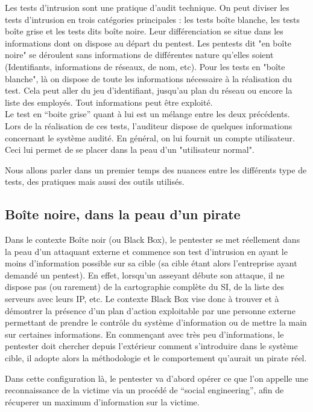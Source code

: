 \documentclass[a4paper]{memoir}
\begin{document}
Les tests d'intrusion sont une pratique d'audit technique. On peut diviser les tests d'intrusion en trois catégories principales : les tests boîte blanche, les tests boîte grise et les tests dits boîte noire. Leur différenciation se situe dans les informations dont on dispose au départ du pentest. Les pentests dit "en boîte noire" se déroulent sans informations de différentes nature qu'elles soient (Identifiants, informations de réseaux, de nom, etc). Pour les tests en "boîte blanche", là on dispose de toute les informations nécessaire à la réalisation du test. Cela peut aller du jeu d'identifiant, jusqu'au plan du réseau ou encore la liste des employés. Tout informations peut être exploité.\\
\noindent Le test en ``boite grise'' quant à lui est un mélange entre les deux précédents. Lors de la réalisation de ces tests, l'auditeur dispose de quelques informations concernant le système audité. En général, on lui fournit un compte utilisateur. Ceci lui permet de se placer dans la peau d'un "utilisateur normal". 

Nous allons parler dans un premier temps des nuances entre les différents type de tests, des pratiques mais aussi des outils utilisés.



\subsection{Boîte noire, dans la peau d'un pirate}

Dans le contexte Boîte noir (ou Black Box), le pentester se met réellement dans la peau d’un attaquant externe et commence son test d’intrusion en ayant le moins d’information possible sur sa cible (sa cible étant alors l’entreprise ayant demandé un pentest). En effet, lorsqu’un asseyant débute son attaque, il ne dispose pas (ou rarement) de la cartographie complète du SI, de la liste des serveurs avec leurs IP, etc. Le contexte Black Box vise donc à trouver et à démontrer la présence d’un plan d’action exploitable par une personne externe permettant de prendre le contrôle du système d’information ou de mettre la main sur certaines informations. En commençant avec très peu d’informations, le pentester doit chercher depuis l’extérieur comment s’introduire dans le système cible, il adopte alors la méthodologie et le comportement qu’aurait un pirate réel. 

Dans cette configuration là, le pentester va d'abord opérer ce que l'on appelle une reconnaissance de la victime via un procédé de ``social engineering'', afin de récuperer un maximum d'information sur la victime.  
\end{document}
